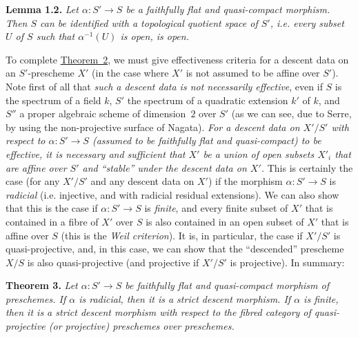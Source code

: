 \documentclass{article}
\newenvironment{itenv}[1]
  {\phantomsection\par\medskip\noindent\textbf{#1.}\itshape}
  {\medskip}
\newcommand{\oldpage}[1]{\marginpar{\footnotesize$\Big\vert$ \textit{p.~#1}}}
\begin{document}
\begin{itenv}{Lemma 1.2}
\label{lemma:B.1.2}
  Let $\alpha\colon S'\to S$ be a faithfully flat and quasi-compact morphism.
  Then $S$ can be identified with a \emph{topological quotient space of $S'$}, i.e. every subset $U$ of $S$ such that $\alpha^{-1}(U)$ is open, is open.
\end{itenv}

To complete \hyperref[theorem:B.1(2)]{Theorem~2}, we must give effectiveness criteria for a descent data on an $S'$-prescheme $X'$ (in the case where $X'$ is not assumed to be affine over $S'$).
Note first of all that \emph{such a descent data is not necessarily effective}, even if $S$ is the spectrum of a field $k$, $S'$ the spectrum of a quadratic extension $k'$ of $k$, and $S''$ a proper algebraic scheme of dimension~$2$ over $S'$ (as we can see, due to Serre, by using the non-projective surface of Nagata).
\emph{For a descent data on $X'/S'$ with respect to $\alpha\colon S'\to S$ (assumed to be faithfully flat and quasi-compact) to be effective, it is necessary and sufficient that $X'$ be a union of open subsets $X'_i$ that are affine over $S'$ and ``stable'' under the descent data on $X'$.}
This is certainly the case (for any $X'/S'$ and any descent data on $X'$) if the morphism $\alpha\colon S'\to S$ is \emph{radicial} (i.e. injective, and with
\oldpage{190-20}
radicial residual extensions).
We can also show that this is the case if $\alpha\colon S'\to S$ is \emph{finite}, and every finite subset of $X'$ that is contained in a fibre of $X'$ over $S$ is also contained in an open subset of $X'$ that is affine over $S$ (this is the \emph{Weil criterion}).
It is, in particular, the case if $X'/S'$ is quasi-projective, and, in this case, we can show that the ``descended'' prescheme $X/S$ is also quasi-projective (and projective if $X'/S'$ is projective).
In summary:

\begin{itenv}{Theorem 3}
\label{theorem:B.1(3)}
  Let $\alpha\colon S'\to S$ be faithfully flat and quasi-compact morphism of preschemes.
  If $\alpha$ is \emph{radicial}, then it is a \emph{strict descent morphism}.
  If $\alpha$ is finite, then it is a strict descent morphism with respect to the fibred category of quasi-projective (or projective) preschemes over preschemes.
\end{itenv}
\end{document}
